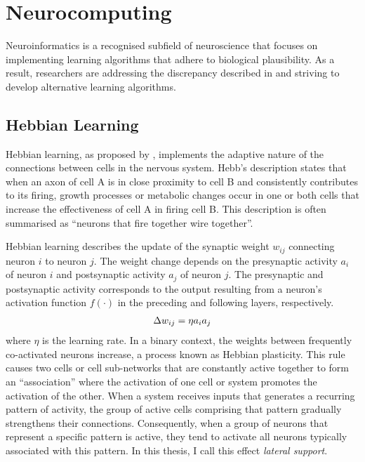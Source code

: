 \section{Neurocomputing}
Neuroinformatics is a recognised subfield of neuroscience that focuses on implementing learning algorithms that adhere to biological plausibility. As a result, researchers are addressing the discrepancy described in  and striving to develop alternative learning algorithms.

\subsection{Hebbian Learning}
Hebbian learning, as proposed by , implements the adaptive nature of the connections between cells in the nervous system. Hebb's description states that when an axon of cell A is in close proximity to cell B and consistently contributes to its firing, growth processes or metabolic changes occur in one or both cells that increase the effectiveness of cell A in firing cell B. This description is often summarised as ``neurons that fire together wire together''.

Hebbian learning describes the update of the synaptic weight $w_{ij}$ connecting neuron $i$ to neuron $j$. The weight change depends on the presynaptic activity $a_i$ of neuron $i$ and postsynaptic activity $a_j$ of neuron $j$. The presynaptic and postsynaptic activity corresponds to the output resulting from a neuron's activation function $f(\cdot)$ in the preceding and following layers, respectively.
%
\begin{align}\eqlbl{hebb_1}
	\Delta w_{ij} = \eta a_i a_j
\end{align}
%
where \(\eta\) is the learning rate.
In a binary context, the weights between frequently co-activated neurons increase, a process known as Hebbian plasticity.
This rule causes two cells or cell sub-networks that are constantly active together to form an ``association'' where the activation of one cell or system promotes the activation of the other.
When a system receives inputs that generates a recurring pattern of activity, the group of active cells comprising that pattern gradually strengthens their connections. Consequently, when a group of neurons that represent a specific pattern is active, they tend to activate all neurons typically associated with this pattern. In this thesis, I call this effect \emph{lateral support}.

